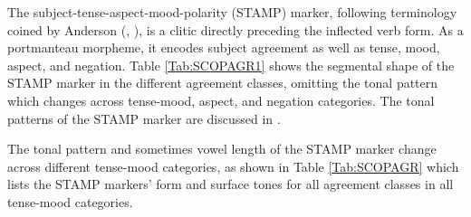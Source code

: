 The subject-tense-aspect-mood-polarity (STAMP) marker, following terminology coined by Anderson (\citeyear{anderson2011b}, \citeyear{anderson2015}), is a clitic directly preceding the inflected verb form. As a portmanteau morpheme, it encodes subject agreement as well as tense, mood, aspect, and negation. Table \ref{Tab:SCOPAGR1} shows the segmental shape of the STAMP marker in the different agreement classes, omitting the tonal pattern which changes across tense-mood, aspect, and negation categories.
The tonal patterns of the STAMP marker are discussed in .

\begin{table}[!h]
\centering
{}
\caption{Shape of the STAMP marker in different AGR classes}
\label{Tab:SCOPAGR1}
\end{table}

The tonal pattern and sometimes vowel length of the STAMP marker change across different tense-mood categories, as shown in Table \ref{Tab:SCOPAGR} which lists the STAMP markers' form and surface tones for all agreement classes in all tense-mood categories.  


\begin{table}[!h]
\centering
{}
\caption{Patterns of STAMP markers in different AGR classes and TM categories}
\label{Tab:SCOPAGR}
\end{table}

